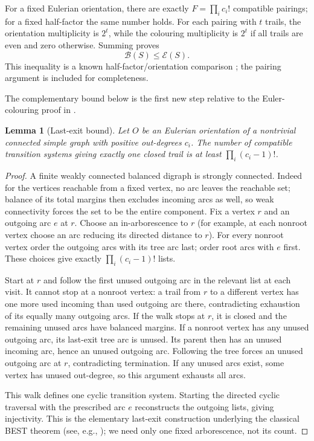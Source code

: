 \documentclass[11pt]{article}
\newtheorem{lemma}[theorem]{Lemma}
\theoremstyle{remark}\newtheorem{remark}[theorem]{Remark}
\newcommand{\EO}{\mathcal E}
\newcommand{\HF}{\mathcal B}
\begin{document}
For a fixed Eulerian orientation, there are exactly $F=\prod_i c_i!$ compatible pairings; for a fixed half-factor the same number holds. For each pairing with $t$ trails, the orientation multiplicity is $2^t$, while the colouring multiplicity is $2^t$ if all trails are even and zero otherwise. Summing proves
\begin{equation}\label{eq:known}
 \HF(S)\le\EO(S).
\end{equation}
This inequality is a known half-factor/orientation comparison \cite{borbenyi,csikvariimolay}; the pairing argument is included for completeness.

The complementary bound below is the first new step relative to the Euler-colouring proof in \cite[Section 9]{mehrdad26}.
\begin{lemma}[Last-exit bound]\label{lem:last}
Let $O$ be an Eulerian orientation of a nontrivial connected simple graph with positive out-degrees $c_i$. The number of compatible transition systems giving exactly one closed trail is at least $\prod_i(c_i-1)!$.
\end{lemma}
\begin{proof}
A finite weakly connected balanced digraph is strongly connected. Indeed for the vertices reachable from a fixed vertex, no arc leaves the reachable set; balance of its total margins then excludes incoming arcs as well, so weak connectivity forces the set to be the entire component. Fix a vertex $r$ and an outgoing arc $e$ at $r$. Choose an in-arborescence to $r$ (for example, at each nonroot vertex choose an arc reducing its directed distance to $r$). For every nonroot vertex order the outgoing arcs with its tree arc last; order root arcs with $e$ first. These choices give exactly $\prod_i(c_i-1)!$ lists.

Start at $r$ and follow the first unused outgoing arc in the relevant list at each visit. It cannot stop at a nonroot vertex: a trail from $r$ to a different vertex has one more used incoming than used outgoing arc there, contradicting exhaustion of its equally many outgoing arcs. If the walk stops at $r$, it is closed and the remaining unused arcs have balanced margins. If a nonroot vertex has any unused outgoing arc, its last-exit tree arc is unused. Its parent then has an unused incoming arc, hence an unused outgoing arc. Following the tree forces an unused outgoing arc at $r$, contradicting termination. If any unused arcs exist, some vertex has unused out-degree, so this argument exhausts all arcs.

This walk defines one cyclic transition system. Starting the directed cyclic traversal with the prescribed arc $e$ reconstructs the outgoing lists, giving injectivity. This is the elementary last-exit construction underlying the classical BEST theorem (see, e.g., \cite{creedcryan}); we need only one fixed arborescence, not its count.
\end{proof}
\end{document}
